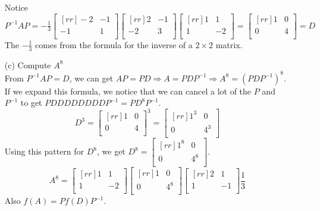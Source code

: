 \documentclass{report}
\begin{document}
\begin{enumerate}
Notice $P^{-1}AP = -\frac{1}{3}\begin{bmatrix}[rr]-2&-1\\-1&1\\\end{bmatrix}\begin{bmatrix}[rr]2&-1\\-2&3\\\end{bmatrix}\begin{bmatrix}[rr]1&1\\1&-2\\\end{bmatrix}=\begin{bmatrix}[rr]1&0\\0&4\\\end{bmatrix}=D$\\
The $-\frac{1}{3}$ comes from the formula for the inverse of a $2\times 2$ matrix.
\item[(c)]Compute $A^8$\\
From $P^{-1}AP=D$, we can get $AP=PD \Rightarrow A=PDP^{-1} \Rightarrow A^8 = (PDP^{-1})^8$. If we expand this formula, we notice that we can cancel a lot of the $P$ and $P^{-1}$ to get $PDDDDDDDDP^{-1} = PD^8P^{-1}$.
\[ D^3 = \begin{bmatrix}[rr]1&0\\0&4\\\end{bmatrix}^3 = \begin{bmatrix}[rr]1^3&0\\0&4^3\\\end{bmatrix} \]
Using this pattern for $D^8$, we get $D^8=\begin{bmatrix}[rr]1^8&0\\0&4^8\\\end{bmatrix}$.
\[ A^8 =\begin{bmatrix}[rr]1&1\\1&-2\\\end{bmatrix}\begin{bmatrix}[rr]1&0\\0&4^8\\\end{bmatrix}\begin{bmatrix}[rr]2&1\\1&-1\\\end{bmatrix}\frac{1}{3} \]
Also $f(A)=Pf(D)P^{-1}$.
\end{enumerate}
\end{document}
